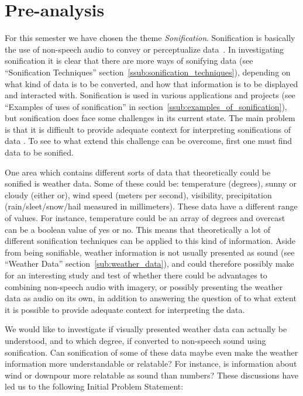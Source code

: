 
\section{Pre-analysis} %
\label{sec:preanalysis}

For this semester we have chosen the theme \emph{Sonification}. 
Sonification is basically the use of non-speech audio to convey or perceptualize data~\cite*{Wiki2014-2}. 
In investigating sonification it is clear that there are more ways of sonifying data (see \enquote{Sonification Techniques} section~\ref{ssub:sonification_techniques}), depending on what kind of data is to be converted, and how that information is to be displayed and interacted with.
Sonification is used in various applications and projects (see \enquote{Examples of uses of sonification} in section~\ref{ssub:examples_of_sonification}), but sonification does face some challenges in its current state. 
The main problem is that it is difficult to provide adequate context for interpreting sonifications of data \cite*{Kramer1993}. 
To see to what extend this challenge can be overcome, first one must find data to be sonified.

One area which contains different sorts of data that theoretically could be sonified is weather data. 
Some of these could be: temperature (degrees), sunny or cloudy (either or), wind speed (meters per second), visibility, precipitation (rain/sleet/snow/hail measured in millimeters). 
These data have a different range of values. 
For instance, temperature could be an array of degrees and overcast can be a boolean value of yes or no. 
This means that theoretically a lot of different sonification techniques can be applied to this kind of information. 
Aside from being sonifiable, weather information is not usually presented as sound (see \enquote{Weather Data} section~\ref{sub:weather_data}), and could therefore possibly make for an interesting study and test of whether there could be advantages to combining non-speech audio with imagery, or possibly presenting the weather data as audio on its own, in addition to answering the question of to what extent it is possible to provide adequate context for interpreting the data.

We would like to investigate if visually presented weather data can actually be understood, and to which degree, if converted to non-speech sound using sonification. 
Can sonification of some of these data maybe even make the weather information more understandable or relatable? 
For instance, is information about wind or downpour more relatable as sound than numbers? 
These discussions have led us to the following Initial Problem Statement:

